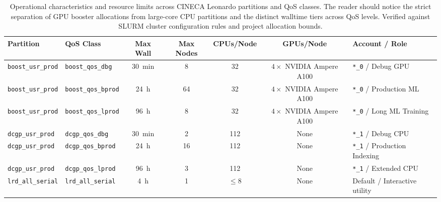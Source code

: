 \begin{table}[htbp]
  \centering
  \small
  \caption{Operational characteristics and resource limits across
    \ac{CINECA}
    Leonardo partitions and QoS classes. The reader should notice the strict
    separation of \ac{GPU} booster allocations from large-core
    \ac{CPU} partitions
    and the distinct walltime tiers across QoS levels. Verified against SLURM
  cluster configuration rules and project allocation bounds.}
  \label{tab:leonardo_partitions}
  \begin{threeparttable}
    \begin{tabularx}{\linewidth}{l l c c c c >{\raggedright\arraybackslash}X}
      \toprule
      \textbf{Partition} & \textbf{QoS Class} & \textbf{Max Wall} &
      \textbf{Max Nodes} & \textbf{\acp{CPU}/Node} & \textbf{\acp{GPU}/Node} &
      \textbf{Account / Role} \\
      \midrule
      \texttt{boost\_usr\_prod} & \texttt{boost\_qos\_dbg}   &
      \qty{30}{\minute} & \num{8}  & \num{32}  & $\num{4} \times $
      NVIDIA Ampere A100 &
      \texttt{*\_0} / Debug \ac{GPU} \\
      \texttt{boost\_usr\_prod} & \texttt{boost\_qos\_bprod} &
      \qty{24}{\hour}   & \num{64} & \num{32}  & $\num{4} \times $
      NVIDIA Ampere A100 &
      \texttt{*\_0} / Production ML \\
      \texttt{boost\_usr\_prod} & \texttt{boost\_qos\_lprod} &
      \qty{96}{\hour}   & \num{8}  & \num{32}  & $\num{4} \times $
      NVIDIA Ampere A100 &
      \texttt{*\_0} / Long ML Training \\
      \texttt{dcgp\_usr\_prod}  & \texttt{dcgp\_qos\_dbg}    &
      \qty{30}{\minute} & \num{2}  & \num{112} & None             &
      \texttt{*\_1} / Debug \ac{CPU} \\
      \texttt{dcgp\_usr\_prod}  & \texttt{dcgp\_qos\_bprod}  &
      \qty{24}{\hour}   & \num{16} & \num{112} & None             &
      \texttt{*\_1} / Production Indexing \\
      \texttt{dcgp\_usr\_prod}  & \texttt{dcgp\_qos\_lprod}  &
      \qty{96}{\hour}   & \num{3}  & \num{112} & None             &
      \texttt{*\_1} / Extended \ac{CPU} \\
      \texttt{lrd\_all\_serial} & \texttt{lrd\_all\_serial}  &
      \qty{4}{\hour}    & \num{1}  & $\le \num{8}$ & None         & Default /
      Interactive utility \\
      \bottomrule
    \end{tabularx}
    \begin{tablenotes}[flushleft]

\end{tablenotes}
\end{threeparttable}
\end{table}
